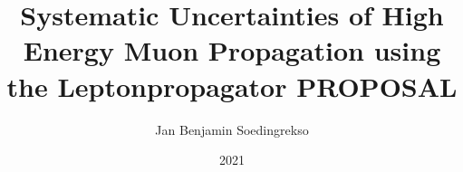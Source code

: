 \documentclass[
  tucolor,       %
  BCOR=12mm,     %
  parskip=half,  %
  open=any,      %
  cleardoublepage=plain,  %
]{tudothesis}
\author{Jan Benjamin Soedingrekso}
\title{Systematic Uncertainties of High Energy Muon Propagation using the Leptonpropagator PROPOSAL}
\date{2021}
\begin{document}
\frontmatter
\maketitle

\makecorrectorpage


\tableofcontents

\mainmatter








\appendix





\backmatter
\printbibliography

\cleardoublepage


\end{document}
